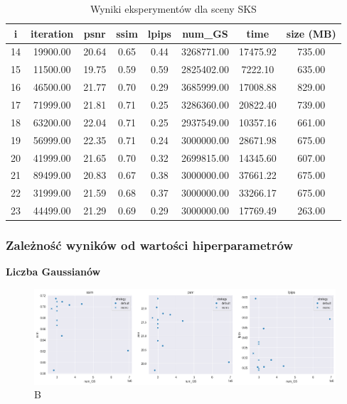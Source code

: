 \begin{table}[h]
    \centering
    \begin{tabular}{|c|c|c|c|c|c|c|c|}
    \hline
    i & iteration & psnr & ssim & lpips & num\_GS & time & size (MB) \\
    \hline
    14 & 19900.00 & 20.64 & 0.65 & 0.44 & 3268771.00 & 17475.92 & 735.00 \\
    \hline
    15 & 11500.00 & 19.75 & 0.59 & 0.59 & 2825402.00 & 7222.10 & 635.00 \\
    \hline
    16 & 46500.00 & 21.77 & 0.70 & 0.29 & 3685999.00 & 17008.88 & 829.00 \\
    \hline
    17 & 71999.00 & 21.81 & 0.71 & 0.25 & 3286360.00 & 20822.40 & 739.00 \\
    \hline
    18 & 63200.00 & 22.04 & 0.71 & 0.25 & 2937549.00 & 10357.16 & 661.00 \\
    \hline
    19 & 56999.00 & 22.35 & 0.71 & 0.24 & 3000000.00 & 28671.98 & 675.00 \\
    \hline
    20 & 41999.00 & 21.65 & 0.70 & 0.32 & 2699815.00 & 14345.60 & 607.00 \\
    \hline
    21 & 89499.00 & 20.83 & 0.67 & 0.38 & 3000000.00 & 37661.22 & 675.00 \\
    \hline
    22 & 31999.00 & 21.59 & 0.68 & 0.37 & 3000000.00 & 33266.17 & 675.00 \\
    \hline
    23 & 44499.00 & 21.29 & 0.69 & 0.29 & 3000000.00 & 17769.49 & 263.00 \\
    \hline
    \end{tabular}
    \caption{Wyniki eksperymentów dla sceny SKS}
    \label{table:tab_res_sks}
\end{table}



\subsubsection{Zależność wyników od wartości hiperparametrów}

\textbf{Liczba Gaussianów}

\begin{figure}[!h]
    \includegraphics[width=\linewidth]{img/numGS_metrics.png}
    \caption{B}\label{fig:metrics_1}
\end{figure}



